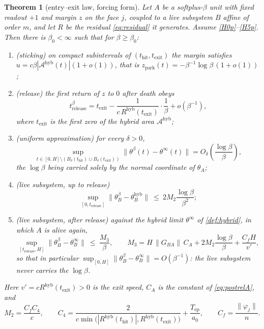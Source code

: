 \documentclass[11pt]{article}
\newtheorem{theorem}{Theorem}
\theoremstyle{definition}
\theoremstyle{remark}
\newcommand{\thit}{t_{\mathrm{hit}}}
\newcommand{\texit}{t_{\mathrm{exit}}}
\newcommand{\trel}{t_{\mathrm{release}}}
\newcommand{\Ar}{\mathcal{A}}                      %
\newcommand{\Tep}{T_{\mathrm{ep}}}   %
\newcommand{\hyb}{\mathrm{hyb}}
\begin{document}
\begin{theorem}[entry--exit law, forcing form]\label{thm:forcing}
Let $A$ be a softplus-$\beta$ unit with fixed readout $+1$ and margin $z$ on the
face $j$, coupled to a live subsystem $B$ affine of order $m$, and let $R$ be
the residual \eqref{eq:residual} it generates. Assume
\textup{\eqref{H0p}--\eqref{H5p}}. Then there is $\beta_0<\infty$ such that for
$\beta\ge\beta_0$:
\begin{enumerate}
\item[(i)] \emph{(sticking)} on compact subintervals of $(\thit,\texit)$ the
margin satisfies $u=c\beta|\Ar^{\hyb}(t)|(1+o(1))$, that is
$z_{\mathrm{park}}(t)=-\beta^{-1}\log\beta\,(1+o(1))$;
\item[(ii)] \emph{(release)} the first return of $z$ to $0$ after death obeys
\begin{equation}\label{eq:releaseF}
t^\beta_{\mathrm{release}}
=\texit-\frac{1}{c\,R^{\hyb}(\texit)}\cdot\frac1\beta+o(\beta^{-1}),
\end{equation}
where $\texit$ is the first zero of the hybrid area $\Ar^{\hyb}$;
\item[(iii)] \emph{(uniform approximation)} for every $\delta>0$,
\begin{equation}\label{eq:supF}
\sup_{t\in[0,H]\setminus(B_\delta(\thit)\cup B_\delta(\texit))}
\bigl\|\theta^\beta(t)-\theta^\infty(t)\bigr\|
=O_\delta\!\left(\frac{\log\beta}{\beta}\right),
\end{equation}
the $\log\beta$ being carried solely by the normal coordinate of $\theta_A$;
\item[(ivA)] \emph{(live subsystem, up to release)}
\begin{equation}\label{eq:ivA}
\sup_{[0,\trel]}\bigl\|\theta_B^\beta-\theta_B^{\hyb}\bigr\|
\ \le\ 2M_2\frac{\log\beta}{\beta^2};
\end{equation}
\item[(ivB)] \emph{(live subsystem, after release)} against the hybrid limit
$\theta^\infty$ of \cref{def:hybrid}, in which $A$ is alive again,
\begin{equation}\label{eq:ivB}
\sup_{[\trel,H]}\bigl\|\theta_B^\beta-\theta_B^{\infty}\bigr\|
\ \le\ \frac{M_3}{\beta},
\qquad
M_3=H\,\|G_{BA}\|\,C_A+2M_2\frac{\log\beta}{\beta}+\frac{C_fH}{v'} ,
\end{equation}
so that in particular
$\sup_{[0,H]}\|\theta_B^\beta-\theta_B^{\infty}\|=O(\beta^{-1})$: the live
subsystem never carries the $\log\beta$.
\end{enumerate}
Here $v'=cR^{\hyb}(\texit)>0$ is the exit speed, $C_A$ is the constant of
\eqref{eq:postrelA}, and
\begin{equation}\label{eq:M2F}
M_2=\frac{C_fC_4}{c},
\qquad
C_4=\frac{2}{c\min\bigl(|R^{\hyb}(\thit)|,R^{\hyb}(\texit)\bigr)}+\frac{\Tep}{a_0},
\qquad
C_f=\frac{\|\varphi_j\|}{n}.
\end{equation}
\end{theorem}
\end{document}
